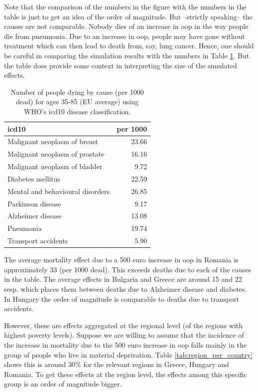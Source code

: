 \documentclass[a4paper,12pt]{article}
\begin{document}
Note that the comparison of the numbers in the figure with the numbers in the table is just to get an idea of the order of magnitude. But --strictly speaking-- the causes are not comparable. Nobody dies of an increase in oop in the way people die from pneumonia. Due to an increase in oop, people may have gone without treatment which can then lead to death from, say, lung cancer. Hence, one should be careful in comparing the simulation results with the numbers in Table \ref{tab:causes_death}. But the table does provide some context in interpreting the size of the simulated effects.

\begin{table}[htbp]
\caption{\label{tab:causes_death}Number of people dying by cause (per 1000 dead) for ages 35-85 (EU average) using WHO's icd10 disease classification.}
\centering
\begin{tabular}{lr}
icd10 & per 1000\\[0pt]
\hline
Malignant neoplasm of breast & 23.66\\[0pt]
Malignant neoplasm of prostate & 16.16\\[0pt]
Malignant neoplasm of bladder & 9.72\\[0pt]
Diabetes mellitus & 22.59\\[0pt]
Mental and behavioural disorders & 26.85\\[0pt]
Parkinson disease & 9.17\\[0pt]
Alzheimer disease & 13.08\\[0pt]
Pneumonia & 19.74\\[0pt]
Transport accidents & 5.90\\[0pt]
\end{tabular}
\end{table}

The average mortality effect due to a 500 euro increase in oop in Romania is approximately 33 (per 1000 dead). This exceeds deaths due to each of the causes in the table. The average effects in Bulgaria and Greece are around 15 and 22 resp. which places them between deaths due to Alzheimer disease and diabetes. In Hungary the order of magnitude is comparable to deaths due to transport accidents.

However, these are effects aggregated at the regional level (of the regions with highest poverty levels). Suppose we are willing to assume that the incidence of the increase in mortality due to the 500 euro increase in oop falls mainly in the group of people who live in material deprivation. Table \ref{tab:region_per_country} shows this is around 30\% for the relevant regions in Greece, Hungary and Romania. To get these effects at the region level, the effects among this specific group is an order of magnitude bigger.
\end{document}
